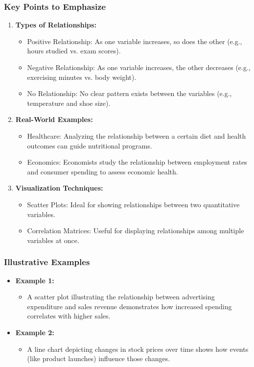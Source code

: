\documentclass[aspectratio=169]{beamer}
\begin{document}
\begin{frame}[fragile]
    \frametitle{Key Points to Emphasize}
    \begin{enumerate}
        \item \textbf{Types of Relationships:}
            \begin{itemize}
                \item Positive Relationship: As one variable increases, so does the other (e.g., hours studied vs. exam scores).
                \item Negative Relationship: As one variable increases, the other decreases (e.g., exercising minutes vs. body weight).
                \item No Relationship: No clear pattern exists between the variables (e.g., temperature and shoe size).
            \end{itemize}
        \item \textbf{Real-World Examples:}
            \begin{itemize}
                \item Healthcare: Analyzing the relationship between a certain diet and health outcomes can guide nutritional programs.
                \item Economics: Economists study the relationship between employment rates and consumer spending to assess economic health.
            \end{itemize}
        \item \textbf{Visualization Techniques:}
            \begin{itemize}
                \item Scatter Plots: Ideal for showing relationships between two quantitative variables.
                \item Correlation Matrices: Useful for displaying relationships among multiple variables at once.
            \end{itemize}
    \end{enumerate}
\end{frame}

\begin{frame}[fragile]
    \frametitle{Illustrative Examples}
    \begin{itemize}
        \item \textbf{Example 1:}
            \begin{itemize}
                \item A scatter plot illustrating the relationship between advertising expenditure and sales revenue demonstrates how increased spending correlates with higher sales.
            \end{itemize}
        \item \textbf{Example 2:}
            \begin{itemize}
                \item A line chart depicting changes in stock prices over time shows how events (like product launches) influence those changes.
            \end{itemize}
    \end{itemize}
\end{frame}
\end{document}
